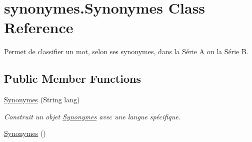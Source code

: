 \hypertarget{classsynonymes_1_1_synonymes}{}\section{synonymes.\+Synonymes Class Reference}
\label{classsynonymes_1_1_synonymes}


Permet de classifier un mot, selon ses synonymes, dans la Série A ou la Série B.  


\subsection*{Public Member Functions}
\begin{DoxyCompactItemize}
\item 
\hyperlink{classsynonymes_1_1_synonymes_a3e2d27070b4226a6d9dd2557353c3865}{Synonymes} (String lang)
\begin{DoxyCompactList}\small\item\em Construit un objet \hyperlink{classsynonymes_1_1_synonymes}{Synonymes} avec une langue spécifique. \end{DoxyCompactList}\item 
\hyperlink{classsynonymes_1_1_synonymes_a2a0f489421e0de3f6f6efc5d9ae9234d}{Synonymes} ()\hypertarget{classsynonymes_1_1_synonymes_a2a0f489421e0de3f6f6efc5d9ae9234d}{}\label{classsynonymes_1_1_synonymes_a2a0f489421e0de3f6f6efc5d9ae9234d}


\end{DoxyCompactItemize}
